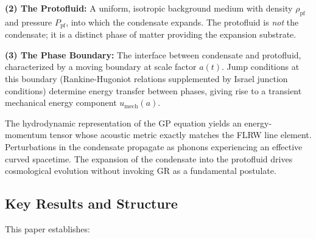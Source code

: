 \documentclass[11pt,a4paper]{article}
\newcommand{\umech}{\ensuremath{u_{\mathrm{mech}}}}
\theoremstyle{definition}
\theoremstyle{remark}
\begin{document}
\textbf{(2) The Protofluid:} A uniform, isotropic background medium with density $\rho_{\mathrm{pf}}$ and pressure $P_{\mathrm{pf}}$, into which the condensate expands. The protofluid is \emph{not} the condensate; it is a distinct phase of matter providing the expansion substrate.

\textbf{(3) The Phase Boundary:} The interface between condensate and protofluid, characterized by a moving boundary at scale factor $a(t)$. Jump conditions at this boundary (Rankine-Hugoniot relations supplemented by Israel junction conditions) determine energy transfer between phases, giving rise to a transient mechanical energy component $\umech(a)$.

The hydrodynamic representation of the GP equation yields an energy-momentum tensor whose acoustic metric exactly matches the FLRW line element. Perturbations in the condensate propagate as phonons experiencing an effective curved spacetime. The expansion of the condensate into the protofluid drives cosmological evolution without invoking GR as a fundamental postulate.

\subsection{Key Results and Structure}
\label{sec:key_results_overview}

This paper establishes:
\end{document}

